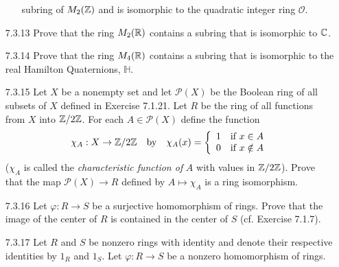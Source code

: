 \begin{enumerate}
\begin{enumerate}
                           subring of $M_2(\mathbb{Z})$ and is isomorphic to the 
                           quadratic integer ring $\mathcal{O}$.
                  \end{enumerate}
   \item[7.3.13]  Prove that the ring $M_2(\mathbb{R})$ contains a subring that is
                  isomorphic to $\mathbb{C}$.
   \item[7.3.14]  Prove that the ring $M_4(\mathbb{R})$ contains a subring that is
                  isomorphic to the real Hamilton Quaternions, $\mathbb{H}$.
   \item[7.3.15]  Let $X$ be a nonempty set and let $\mathcal{P}(X)$ be the
                  Boolean ring of all subsets of $X$ defined in Exercise 7.1.21.
                  Let $R$ be the ring of all functions from $X$ into $\mathbb{Z}/2\mathbb{Z}$.
                  For each $A \in \mathcal{P}(X)$ define the function
                  $$\chi_A : X \rightarrow \mathbb{Z}/2\mathbb{Z} \quad \text{by} \quad
                    \chi_A(x) = \left\{
                       \begin{array}{ll}
                          1 & \text{if } x \in A \\
                          0 & \text{if } x \notin A
                       \end{array} \right.
                  $$
                  ($\chi_A$ is called the \textit{characteristic function of }
                  $A$ with values in $\mathbb{Z}/2\mathbb{Z}$). Prove that the map
                  $\mathcal{P}(X) \rightarrow R$ defined by $A \mapsto \chi_A$
                  is a ring isomorphism.
   \item[7.3.16]  Let $\varphi : R \rightarrow S$ be a surjective homomorphism
                  of rings. Prove that the image of the center of $R$ is
                  contained in the center of $S$ (cf. Exercise 7.1.7).
   \item[7.3.17]  Let $R$ and $S$ be nonzero rings with identity and denote
                  their respective identities by $1_R$ and $1_S$. Let
                  $\varphi : R \rightarrow S$ be a nonzero homomorphism of
                  rings.
                  \begin{enumerate}

\end{enumerate}
\end{enumerate}
